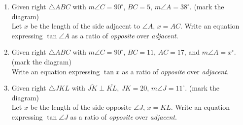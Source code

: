 \documentclass[12pt, twoside]{article}
\begin{document}
\begin{enumerate}
\newpage
  \item Given right $\triangle ABC$ with $m\angle C =90^\circ$, $BC=5$, $m\angle A=38^\circ$. (mark the diagram)\\[0.5cm]
  Let $x$ be the length of the side adjacent to $\angle A$, $x=AC$. Write an equation expressing $\tan \angle A$ as a ratio of \emph{opposite} over \emph{adjacent}.
    \begin{flushright}
      \end{flushright}

  \item Given right $\triangle ABC$ with $m\angle C =90^\circ$, $BC=11$, $AC=17$, and $m\angle A=x^\circ$. (mark the diagram)\\[0.5cm]
  Write an equation expressing $\tan x$ as a ratio of \emph{opposite} over \emph{adjacent}.
    \begin{flushright}
      \end{flushright}
  
  \item Given right $\triangle JKL$ with $\overline{JK} \perp \overline{KL}$, $JK=20$, $m\angle J=11^\circ$. (mark the diagram)\\[0.5cm]
    Let $x$ be the length of the side opposite $\angle J$, $x=KL$. Write an equation expressing $\tan \angle J$ as a ratio of \emph{opposite} over \emph{adjacent}.
      \begin{flushright}
        \end{flushright}
\newpage

\end{enumerate}
\end{document}
